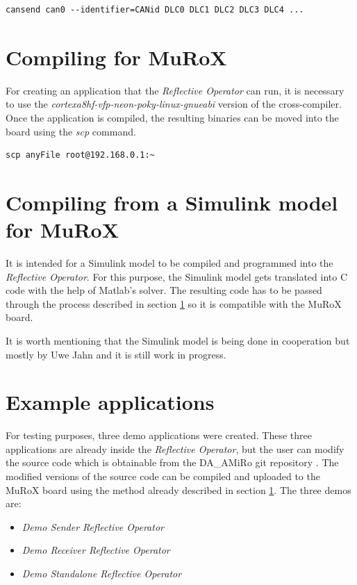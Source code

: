 \documentclass[12pt]{report}%
\begin{document}
\begin{lstlisting}[caption = CAN send format, label = CAN:debug, captionpos = b]
cansend can0 --identifier=CANid DLC0 DLC1 DLC2 DLC3 DLC4 ...
\end{lstlisting}

\section{Compiling for MuRoX}
\label{sec:poky}
For creating an application that the \textit{Reflective Operator} can run, it is necessary to use the \textit{cortexa8hf-vfp-neon-poky-linux-gnueabi} version of the cross-compiler. Once the application is compiled, the resulting binaries can be moved into the board using the \textit{scp} command.

\begin{lstlisting}[caption = moving files into MuRoX board \cite{AMiRo_Murox}, label = CAN:debug, captionpos = b]
scp anyFile root@192.168.0.1:~
\end{lstlisting}

\section{Compiling from a Simulink model for MuRoX}
It is intended for a Simulink model to be compiled and programmed into the \textit{Reflective Operator}. For this purpose, the Simulink model gets translated into C code with the help of Matlab's solver. The resulting code has to be passed through the process described in section \ref{sec:poky} so it is compatible with the MuRoX board.

It is worth mentioning that the Simulink model is being done in cooperation but mostly by Uwe Jahn and it is still work in progress.

\section{Example applications}
\label{sect:example}
For testing purposes, three demo applications were created. These three applications are already inside the \textit{Reflective Operator}, but the user can modify the source code which is obtainable from the DA\_AMiRo git repository \cite{AMiRo_Git}. The modified versions of the source code can be compiled and uploaded to the MuRoX board using the method already described in section \ref{sec:poky}. The three demos are:

\begin{itemize}
  \item \textit{Demo Sender Reflective Operator}
  \item \textit{Demo Receiver Reflective Operator}
	\item \textit{Demo Standalone Reflective Operator}
\end{itemize}
\end{document}
